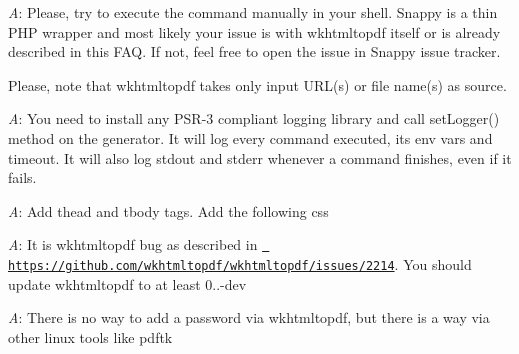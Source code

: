 
{\itshape A}\+: Please, try to execute the command manually in your shell. Snappy is a thin PHP wrapper and most likely your issue is with wkhtmltopdf itself or is already described in this FAQ. If not, feel free to open the issue in Snappy issue tracker.

Please, note that wkhtmltopdf takes only input URL(s) or file name(s) as source.


{\itshape A}\+: You need to install any PSR-\/3 compliant logging library and call {\ttfamily set\+Logger()} method on the generator. It will log every command executed, its env vars and timeout. It will also log stdout and stderr whenever a command finishes, even if it fails.


{\itshape A}\+: Add {\ttfamily thead} and {\ttfamily tbody} tags. Add the following css 
\begin{DoxyCode}{0}

\end{DoxyCode}



{\itshape A}\+: It is wkhtmltopdf bug as described in \href{https://github.com/wkhtmltopdf/wkhtmltopdf/issues/2214}{\texttt{ https\+://github.\+com/wkhtmltopdf/wkhtmltopdf/issues/2214}}. You should update wkhtmltopdf to at least 0..-\/dev


{\itshape A}\+: There is no way to add a password via wkhtmltopdf, but there is a way via other linux tools like pdftk


